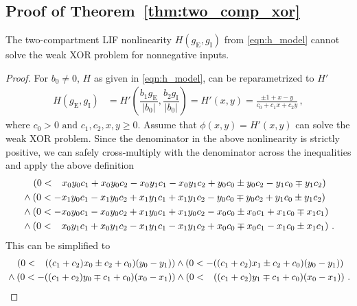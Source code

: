 \subsection{Proof of Theorem~\ref{thm:two_comp_xor}}
\label{app:two_comp_xor_proof}

\begin{theorem}
The two-compartment LIF nonlinearity $H(g_\mathrm{E}, g_\mathrm{I})$ from \cref{eqn:h_model} cannot solve the weak XOR problem for nonnegative inputs.
\end{theorem}

\begin{proof}
For $b_0 \neq 0$, $H$ as given in \cref{eqn:h_model}, can be reparametrized to $H'$
\begin{align*} 
	H(g_\mathrm{E}, g_\mathrm{I}) &= H'\left( \dfrac{b_1  g_\mathrm{E}}{| b_0 |}, \dfrac{b_2 g_\mathrm{I}}{| b_0 |} \right) = H'(x, y) = \frac{\pm 1 + x - y}{c_0 + c_1 x + c_2 y} \,,
\end{align*}
where $c_0 > 0 \text{ and } c_1, c_2, x, y \geq 0$.
Assume that $\phi(x, y) = H'(x, y)$ can solve the weak XOR problem. Since the denominator in the above nonlinearity is strictly positive, we can safely cross-multiply with the denominator across the inequalities and apply the above definition
\begin{align*}
		&\quad   \left( 0 < \hphantom{-}  x_0 y_0 c_1 + x_0 y_0 c_2 - x_0 y_1 c_1 - x_0 y_1 c_2 + y_0 c_0 \pm y_0 c_2 - y_1 c_0 \mp y_1 c_2 \right) \\
		&\wedge  \left( 0 <           -   x_1 y_0 c_1 - x_1 y_0 c_2 + x_1 y_1 c_1 + x_1 y_1 c_2 - y_0 c_0 \mp y_0 c_2 + y_1 c_0 \pm y_1 c_2 \right) \\
		&\wedge  \left( 0 <           -   x_0 y_0 c_1 - x_0 y_0 c_2 + x_1 y_0 c_1 + x_1 y_0 c_2 - x_0 c_0 \pm x_0 c_1 + x_1 c_0 \mp x_1 c_1 \right) \\
		&\wedge  \left( 0 < \hphantom{-}  x_0 y_1 c_1 + x_0 y_1 c_2 - x_1 y_1 c_1 - x_1 y_1 c_2 + x_0 c_0 \mp x_0 c_1 - x_1 c_0 \pm x_1 c_1 \right) \,.
\end{align*}
This can be simplified to
\begin{align*}
		&\quad   \left( 0 < \hphantom{-} ((c_1 + c_2) x_0 \pm c_2 + c_0) (y_0 - y_1) \right)
		 \wedge  \left( 0 <           -  ((c_1 + c_2) x_1 \pm c_2 + c_0) (y_0 - y_1) \right) \\
		&\wedge  \left( 0 <           -  ((c_1 + c_2) y_0 \mp c_1 + c_0) (x_0 - x_1) \right)
		 \wedge  \left( 0 < \hphantom{-} ((c_1 + c_2) y_1 \mp c_1 + c_0) (x_0 - x_1) \right) \,.

\end{align*}
\end{proof}
